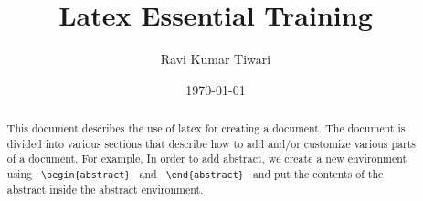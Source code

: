 \documentclass{article}
\begin{document}
\title{Latex Essential Training}
\author{Ravi Kumar Tiwari}
\date{\today}
\maketitle

\begin{abstract}
This document describes the use of latex for creating a document. The document is divided into various sections that describe
how to add and/or customize various parts of a document. For example, In order to add abstract, we create a new environment 
using \verb+ \begin{abstract} + and \verb+ \end{abstract} + and put the contents of the abstract inside the abstract environment.
\end{abstract}
\end{document}
